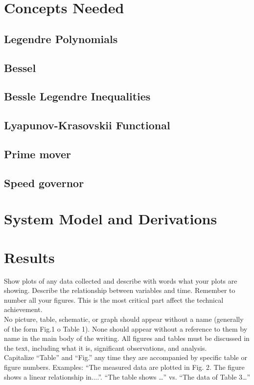 \documentclass[journal]{IEEEtran}
\begin{document}
\section{Concepts Needed}
\subsection{Legendre Polynomials}
\subsection{Bessel}
\subsection{Bessle Legendre Inequalities}
\subsection{Lyapunov-Krasovskii Functional}
\subsection{Prime mover}
\subsection{Speed governor}
\section{System Model and Derivations}
\section{Results}
Show plots of any data collected and describe with words what your plots are showing. Describe the relationship between variables and time. Remember to number all your figures.  This is the most critical part affect the technical achievement.\\
No picture, table, schematic, or graph should appear without a name (generally of the form Fig.1 o Table 1). %
None should appear without a reference to them by name in the main body of the writing.
All figures and tables must be discussed in the text, including what it is, significant observations, and analysis. \\
Capitalize “Table” and “Fig.” any time they are accompanied by specific table or figure numbers. Examples: “The measured data are plotted in Fig. 2. The figure shows a linear relationship in....”. “The table shows …” vs. “The data of Table 3…” \\
\end{document}
